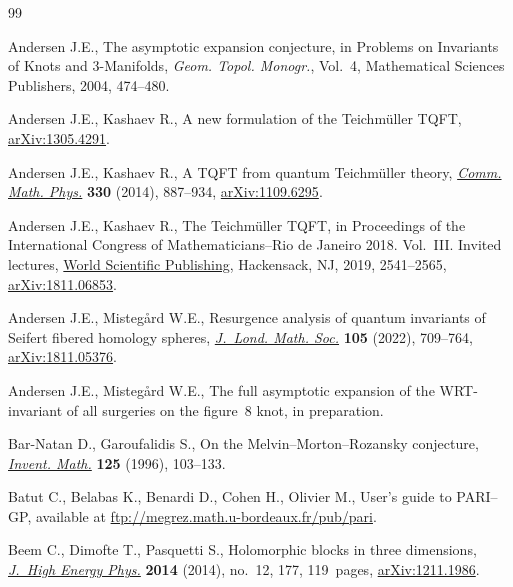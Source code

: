 \documentclass[pdftex]{sigma}
\numberwithin{equation}{section}
\begin{document}
\begin{thebibliography}{99}
\footnotesize\itemsep=0pt

Andersen J.E., The asymptotic expansion conjecture, in {P}roblems on Invariants
  of Knots and 3-Manifolds, \textit{Geom. Topol. Monogr.}, Vol.~4, Mathematical
  Sciences Publishers, 2004, 474--480.

Andersen J.E., Kashaev R., A new formulation of the {T}eichm\"uller {TQFT},
  \href{https://arxiv.org/abs/1305.4291}{arXiv:1305.4291}.

Andersen J.E., Kashaev R., A {TQFT} from quantum {T}eichm\"uller theory,
 \href{https://doi.org/10.1007/s00220-014-2073-2}{\textit{Comm. Math. Phys.}} \textbf{330} (2014), 887--934, \href{https://arxiv.org/abs/1109.6295}{arXiv:1109.6295}.

Andersen J.E., Kashaev R., The {T}eichm\"uller {TQFT}, in Proceedings of the
  {I}nternational {C}ongress of {M}athematicians--{R}io de {J}aneiro 2018.
  {V}ol.~{III}. {I}nvited lectures, \href{https://doi.org/10.1142/9789813272880_0149}{World Scientific Publishing}, Hackensack,
  NJ, 2019, 2541--2565, \href{https://arxiv.org/abs/1811.06853}{arXiv:1811.06853}.

Andersen J.E., Misteg{\aa}rd W.E., Resurgence analysis of quantum invariants of
  {S}eifert fibered homology spheres, \href{https://doi.org/10.1112/jlms.12506}{\textit{J.~Lond. Math. Soc.}} \textbf{105}
  (2022), 709--764, \href{https://arxiv.org/abs/1811.05376}{arXiv:1811.05376}.

Andersen J.E., Misteg{\aa}rd W.E., The full asymptotic expansion of the
  {WRT}-invariant of all surgeries on the figure~8 knot, {i}n preparation.

Bar-Natan D., Garoufalidis S., On the {M}elvin--{M}orton--{R}ozansky
  conjecture, \href{https://doi.org/10.1007/s002220050070}{\textit{Invent. Math.}} \textbf{125} (1996), 103--133.

Batut C., Belabas K., Benardi D., Cohen H., Olivier M., User's guide to
  {PARI--GP}, {a}vailable at \url{ftp://megrez.math.u-bordeaux.fr/pub/pari}.

Beem C., Dimofte T., Pasquetti S., Holomorphic blocks in three dimensions,
  \href{https://doi.org/10.1007/JHEP12(2014)177}{\textit{J.~High Energy Phys.}} \textbf{2014} (2014), no.~12, 177, 119~pages,
  \href{https://arxiv.org/abs/1211.1986}{arXiv:1211.1986}.


\end{thebibliography}
\end{document}
